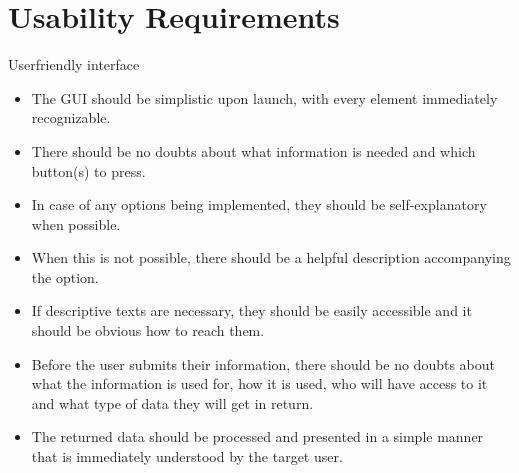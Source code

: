 \section{Usability Requirements}
\begin{requirement}{Userfriendly interface} 
\begin{itemize}
  \item The \ac{GUI} should be simplistic upon launch, with every element
  immediately recognizable.
  \item There should be no doubts about what information is needed and which button(s) to press.
  \item In case of any options being implemented, they should be self-explanatory when possible.
  \item When this is not possible, there should be a helpful description
  accompanying the option.
  \item If descriptive texts are necessary, they should be easily accessible and
  it should be obvious how to reach them.
  \item Before the user submits their information, there should be no doubts
  about what the information is used for, how it is used, who will have access to it and what type of data they will get in return.
  \item The returned data should be processed and presented in a simple manner that is immediately understood by the
        target user.
\end{itemize}
\end{requirement}